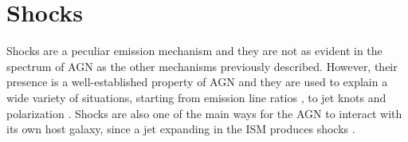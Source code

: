 \documentclass[../main.tex]{subfiles}
\begin{document}
\section{Shocks}
\label{sec:shocks}

Shocks are a peculiar emission mechanism and they are not as evident in the spectrum of AGN as the other mechanisms previously described.
However, their presence is a well-established property of AGN \citep[e.g.][]{Dopita95}
and they are used to explain a wide variety of situations, starting from emission line ratios \citep[e.g.][]{Dopita95b,Dopita00,Contini02,Congiu17}, to jet knots and polarization \citep[e.g.][]{Lister05, Beckmann12}.
Shocks are also one of the main ways for the AGN to interact with its own host galaxy, since a jet expanding in the ISM produces shocks \citep{Dopita00,Fragile17}.
\end{document}
